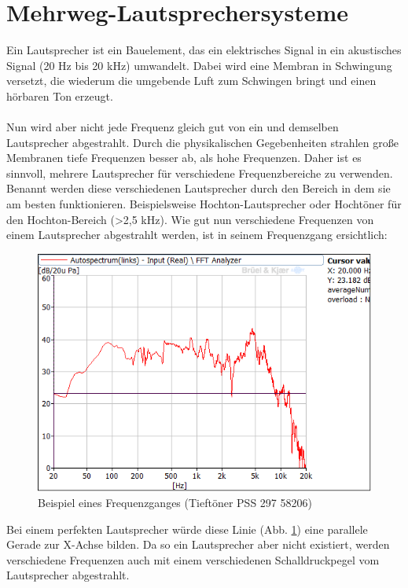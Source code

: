 \newpage
\section{Mehrweg-Lautsprechersysteme}\label{sec:3.2}
Ein Lautsprecher ist ein Bauelement, das ein elektrisches Signal in ein akustisches Signal (20 Hz bis 20 kHz) umwandelt.
Dabei wird eine Membran in Schwingung versetzt, die wiederum die umgebende Luft zum Schwingen bringt und einen hörbaren Ton erzeugt.
\\ \\
Nun wird aber nicht jede Frequenz gleich gut von ein und demselben Lautsprecher abgestrahlt.
Durch die physikalischen Gegebenheiten strahlen große Membranen tiefe Frequenzen besser ab, als hohe Frequenzen.
Daher ist es sinnvoll, mehrere Lautsprecher für verschiedene Frequenzbereiche zu verwenden.
Benannt werden diese verschiedenen Lautsprecher durch den Bereich in dem sie am besten funktionieren.
Beispielsweise Hochton-Lautsprecher oder Hochtöner für den Hochton-Bereich (>2,5 kHz).
Wie gut nun verschiedene Frequenzen von einem Lautsprecher abgestrahlt werden, ist in seinem Frequenzgang ersichtlich:
\begin{figure} [H]
	\centering
	\includegraphics[width=1\textwidth]{img/LSMessung/TT1_9,17l_bestes.png}
	\caption{Beispiel eines Frequenzganges (Tieftöner PSS 297 58206)}
	\label{fig:3.2.1}
\end{figure}
Bei einem perfekten Lautsprecher würde diese Linie (Abb. \ref{fig:3.2.1}) eine parallele Gerade zur X-Achse bilden.
Da so ein Lautsprecher aber nicht existiert, werden verschiedene Frequenzen auch mit einem verschiedenen Schalldruckpegel vom Lautsprecher abgestrahlt.
